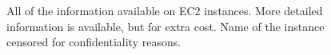 \begin{figure}[!htbp]
    \centering
    \caption[AWS EC2 Basic Monitoring]{All of the information available on EC2 instances. More detailed information is available, but for extra cost. Name of the instance censored for confidentiality reasons.}
    \label{fig:aws-ec2-basic-observability}
\end{figure} 
    